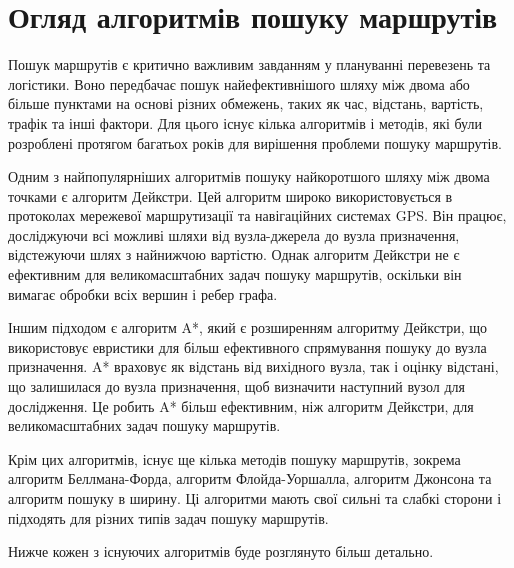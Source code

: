 \section{Огляд алгоритмів пошуку маршрутів}
\label{sec:route-search-algorithms}

Пошук маршрутів є критично важливим завданням у плануванні перевезень та логістики. Воно передбачає пошук найефективнішого шляху між двома або більше пунктами на основі різних обмежень, таких як час, відстань, вартість, трафік та інші фактори. Для цього існує кілька алгоритмів і методів, які були розроблені протягом багатьох років для вирішення проблеми пошуку маршрутів.

Одним з найпопулярніших алгоритмів пошуку найкоротшого шляху між двома точками є алгоритм Дейкстри. Цей алгоритм широко використовується в протоколах мережевої маршрутизації та навігаційних системах GPS. Він працює, досліджуючи всі можливі шляхи від вузла-джерела до вузла призначення, відстежуючи шлях з найнижчою вартістю. Однак алгоритм Дейкстри не є ефективним для великомасштабних задач пошуку маршрутів, оскільки він вимагає обробки всіх вершин і ребер графа.

Іншим підходом є алгоритм A*, який є розширенням алгоритму Дейкстри, що використовує евристики для більш ефективного спрямування пошуку до вузла призначення. A* враховує як відстань від вихідного вузла, так і оцінку відстані, що залишилася до вузла призначення, щоб визначити наступний вузол для дослідження. Це робить A* більш ефективним, ніж алгоритм Дейкстри, для великомасштабних задач пошуку маршрутів.

Крім цих алгоритмів, існує ще кілька методів пошуку маршрутів, зокрема алгоритм Беллмана-Форда, алгоритм Флойда-Уоршалла, алгоритм Джонсона та алгоритм пошуку в ширину. Ці алгоритми мають свої сильні та слабкі сторони і підходять для різних типів задач пошуку маршрутів.

Нижче кожен з існуючих алгоритмів буде розглянуто більш детально.










